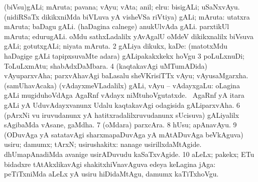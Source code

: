 {{{{{{\bentry
{} 
\gl{\nA}
\expl{}
\bmng
\bnum
{} 
\banum
{} (biVsu)gALi; mAruta; pavana; vAyu; vAta; anil; elru:  bisigALi; uSaNxvAyu. 
 (nidiRSaTx dikikxniMda biVLuva yA visheVSa riVtiya) gALi; mAruta:  utatxra mAruta; baDagu gALi.  (haDagina calnege) anukUlvAda gALi.  parxtikUl mAruta; edurugALi.  oMdu sathxLadalilx yAvAgalU oMdeV dikikxnalilx biVsuva gALi; gotutxgALi; niyata mAruta. 
\eanum
\numie
\num{2} gALiya dikukx, kaDe:  (matotxMdu haDagige gALi tapipxsuvaMte adara) gALipakakxkekx hoVgu 
\num{3} poLuLxnuDi; ToLuLxmAtu; shabAdxDaMbara. 
\num{4} (kaqtakavAgi uMTumADida) vAyuparxvAha; parxvAhavAgi baLasalu sheVKrisiTTx vAyu; vAyusaMgarxha. 
\banum
{} (samUhavAcaka) (vAdayxmeVLadalilx) gALi, vAyu -- vAdayxgaLu:  oLagina gALi mugiduhoVdAga AgaRnf vAdayx niMtuhoVgutatxde. 
 \kanmu\ AgaRnf yA itara gALi yA UduvAdayxvanunx Udalu kaqtakavAgi odagisida gALiparxvAha. 
\eanum
\numie
\num{6} (pArxNi \mo vu iruvudanunx yA hatitxradalilxruvudanunx sUcisuva) gALiyalilx sAgibaMda vAsane, gaMdha. 
\num{7} (oMdara) parxcAra. 
\num{8} hUsu; apAnavAyu. 
\num{9} (ODuvAga yA satatavAgi sharxmapaDuvAga yA mAtADuvAga beVkAguva) usiru; damumx; tArxN; usirushakitx:  nanage usirillxdaMtAgide.  dhUmapAnadiMda avanige usirADuvudu kaSaTxvAgide. 
\num{10} aLeLx; pakekx; ETu bidadxre tAtAkxlikavAgi shakitxhiVnavAguva edeya keLagina jAga:  peTiTxniMda aLeLx yA usiru hiDidaMtAgu, damumx kaTiTxhoVgu. 
\enum
\emng

}}}}}}
